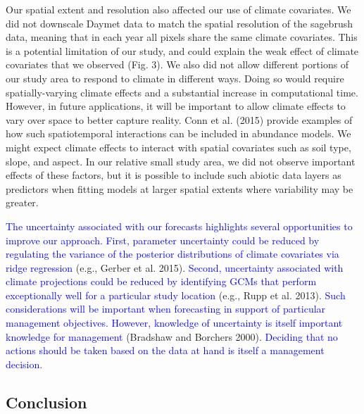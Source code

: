 \documentclass[12pt,]{article}
\begin{document}
Our spatial extent and resolution also affected our use of climate
covariates. We did not downscale Daymet data to match the spatial
resolution of the sagebrush data, meaning that in each year all pixels
share the same climate covariates. This is a potential limitation of our
study, and could explain the weak effect of climate covariates that we
observed (Fig. 3). We also did not allow different portions of our study
area to respond to climate in different ways. Doing so would require
spatially-varying climate effects and a substantial increase in
computational time. However, in future applications, it will be
important to allow climate effects to vary over space to better capture
reality. Conn et al. (2015) provide examples of how such spatiotemporal
interactions can be included in abundance models. We might expect
climate effects to interact with spatial covariates such as soil type,
slope, and aspect. In our relative small study area, we did not observe
important effects of these factors, but it is possible to include such
abiotic data layers as predictors when fitting models at larger spatial
extents where variability may be greater.

\textcolor{blue}{The uncertainty associated with our forecasts highlights several opportunities to improve our approach.
First, parameter uncertainty could be reduced by regulating the variance of the posterior distributions of climate covariates via ridge regression}
(e.g., Gerber et al. 2015).
\textcolor{blue}{Second, uncertainty associated with climate projections could be reduced by identifying GCMs that perform exceptionally well for a particular study location}
(e.g., Rupp et al. 2013).
\textcolor{blue}{Such considerations will be important when forecasting in support of particular management objectives.}
\textcolor{blue}{However, knowledge of uncertainty is itself important knowledge for management}
(Bradshaw and Borchers 2000).
\textcolor{blue}{Deciding that no actions should be taken based on the data at hand is itself a management decision.}

\subsection{Conclusion}\label{conclusion}
\end{document}
